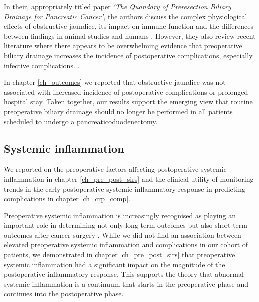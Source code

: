 In their, appropriately titled paper \textit{`The Quandary of Preresection Biliary Drainage for Pancreatic Cancer'}, the authors discuss the complex physiological effects of obstructive jaundice, its impact on immune function and the differences between findings in animal studies and humans \parencite{tol_quandary_2012}.
However, they also review recent literature where there appears to be overwhelming evidence that preoperative biliary drainage increases the incidence of postoperative complications, especially infective complications. \parencite{van_der_gaag_preoperative_2010, arkadopoulos_preoperative_2014, fujii_preoperative_2015, furukawa_negative_2015}.

In chapter \ref{ch_outcomes} we reported that obstructive jaundice was not associated with increased incidence of postoperative complications or prolonged hospital stay. 
Taken together, our results support the emerging view that routine preoperative biliary drainage should no longer be performed in all patients scheduled to undergo a pancreaticoduodenectomy.

\subsection{Systemic inflammation}
We reported on the preoperative factors affecting postoperative systemic inflammation in chapter \ref{ch_pre_post_sirs} and the clinical utility of monitoring trends in the early postoperative systemic inflammatory response in predicting complications in chapter \ref{ch_crp_comp}.

Preoperative systemic inflammation is increasingly recognised as playing an important role in determining not only long-term outcomes but also short-term outcomes after cancer surgery \parencite{kubo_elevated_2013, mohri_correlation_2014, moyes_preoperative_2009, neal_preoperative_2011, vashist_glasgow_2010,  haupt_association_1997}.
While we did not find an association between elevated preoperative systemic inflammation and complications in our cohort of patients, we demonstrated in chapter \ref{ch_pre_post_sirs} that preoperative systemic inflammation had a significant impact on  the magnitude of the postoperative inflammatory response.
This supports the theory that abnormal systemic inflammation is a continuum that starts in the preoperative phase and continues into the postoperative phase.

